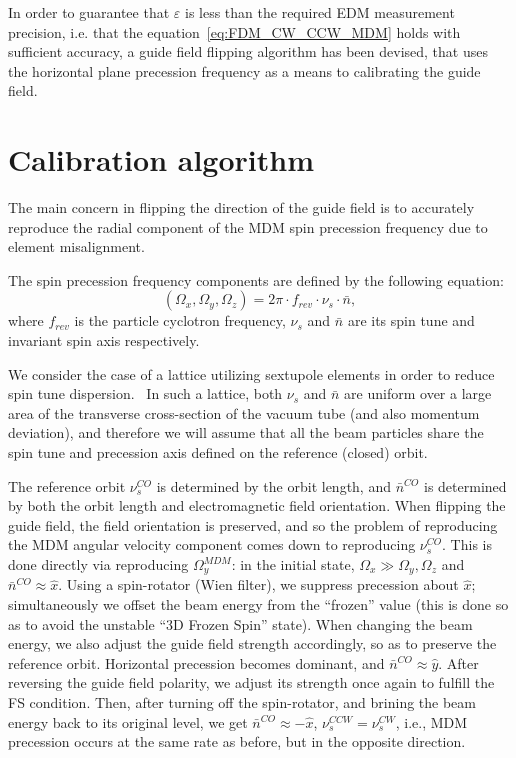 \documentclass[a4paper]{jacow}
\newcommand{\W}{\Omega}
\begin{document}
In order to guarantee that $\varepsilon$ is less than the required EDM measurement precision, i.e. that the equation~\eqref{eq:FDM_CW_CCW_MDM} holds with sufficient accuracy, a guide field flipping algorithm has been devised, that uses the horizontal plane precession frequency as a means to calibrating the guide field. 

\section{Calibration algorithm}
The main concern in flipping the direction of the guide field is to accurately reproduce the radial component
of the MDM spin precession frequency due to element misalignment.

The spin precession frequency components are defined by the following equation:~\cite[p.~4]{COSY:SpinTuneMapping}
\[
(\W_x, \W_y, \W_z) = 2\pi\cdot f_{rev} \cdot \nu_s \cdot \bar n,
\]
where $f_{rev}$ is the particle cyclotron frequency, $\nu_s$ and $\bar n$ are its spin tune and invariant spin axis respectively.

We consider the case of a lattice utilizing sextupole elements in order to reduce spin tune dispersion.~\cite{Aksentev:DecohIPAC19} In such a lattice, both $\nu_s$ and $\bar n$ are uniform over a large area of the transverse cross-section of the vacuum tube (and also momentum deviation), and therefore we will assume that all the beam particles share the spin tune and precession axis defined on the reference (closed) orbit.

The reference orbit $\nu_s^{CO}$ is determined by the orbit length, and $\bar n^{CO}$ is determined by both the orbit length and electromagnetic field orientation. When flipping the guide field, the field orientation is preserved, and so the problem of reproducing the MDM angular velocity component comes down to reproducing $\nu_s^{CO}$. This is done directly via reproducing $\W_y^{MDM}$:
in the initial state, $\W_x\gg \W_y, \W_z$ and $\bar n^{CO}\approx \hat x$. Using a spin-rotator (Wien filter), we 
suppress precession about $\hat x$; simultaneously we offset the beam energy from the ``frozen'' value (this is done so as to avoid the unstable ``3D Frozen Spin'' state).  When changing the beam energy, we also adjust the guide field strength accordingly, so as to preserve the reference orbit. Horizontal precession becomes dominant, and $\bar n^{CO}\approx \hat y$. After reversing the guide field polarity, we adjust its strength once again to fulfill the FS condition. Then, after turning off the spin-rotator, and brining the beam energy back to its original level, we get $\bar n^{CO}\approx -\hat x$, $\nu_s^{CCW} = \nu_s^{CW}$, i.e., MDM precession occurs at the same rate as before, but in the opposite direction.
\end{document}
